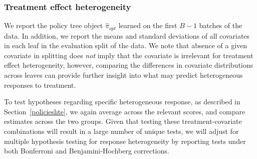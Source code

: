 \documentclass[letterpaper, 12pt, parskip=full,DIV=10]{scrartcl}
\begin{document}
\subsubsection{Treatment effect heterogeneity}
We report the policy tree object $\hat{\pi}_{opt}$ learned on the first $B-1$ batches of the data. In addition, we report the means and standard deviations of all covariates in each leaf in the evaluation split of the data. We note that absence of a given covariate in splitting does \textit{not} imply that the covariate is irrelevant for treatment effect heterogeneity, however, comparing the differences in covariate distributions across leaves can provide further insight into what may predict heterogeneous responses to treatment. 

To test hypotheses regarding specific heterogeneous response, as described in Section~\ref{policieshte}, we again average across the relevant scores, and compare estimates across the two groups. Given that testing these treatment-covariate combinations will result in a large number of unique tests, we will adjust for multiple hypothesis testing for response heterogeneity by reporting tests under both Bonferroni and Benjamini-Hochberg corrections.
\end{document}
